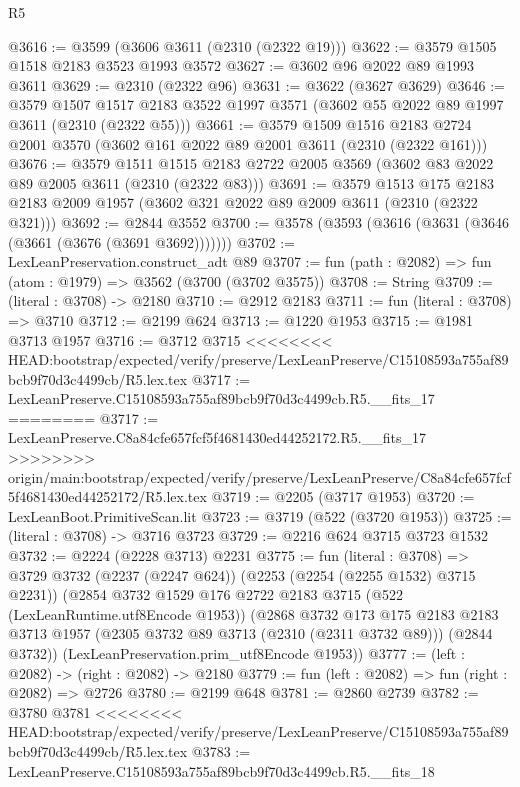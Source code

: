 \begin{lexlean}{R5}
\begin{coremodule}
{{{{{{{{{{{{{{{{{{{{{{{{{{{{{{{{{{{{{{{{{{{{{{{{{{{{{{{{{{{{{{@3616 := @3599 (@3606 @3611 (@2310 (@2322 @19)))
@3622 := @3579 @1505 @1518 @2183 @3523 @1993 @3572
@3627 := @3602 @96 @2022 @89 @1993 @3611
@3629 := @2310 (@2322 @96)
@3631 := @3622 (@3627 @3629)
@3646 := @3579
    @1507
    @1517
    @2183
    @3522
    @1997
    @3571
    (@3602 @55 @2022 @89 @1997 @3611 (@2310 (@2322 @55)))
@3661 := @3579
    @1509
    @1516
    @2183
    @2724
    @2001
    @3570
    (@3602 @161 @2022 @89 @2001 @3611 (@2310 (@2322 @161)))
@3676 := @3579
    @1511
    @1515
    @2183
    @2722
    @2005
    @3569
    (@3602 @83 @2022 @89 @2005 @3611 (@2310 (@2322 @83)))
@3691 := @3579
    @1513
    @175
    @2183
    @2183
    @2009
    @1957
    (@3602 @321 @2022 @89 @2009 @3611 (@2310 (@2322 @321)))
@3692 := @2844 @3552
@3700 := @3578 (@3593 (@3616 (@3631 (@3646 (@3661 (@3676 (@3691 @3692)))))))
@3702 := LexLeanPreservation.construct_adt @89
@3707 := fun (path : @2082) => fun (atom : @1979) => @3562 (@3700 (@3702 @3575))
@3708 := String
@3709 := (literal : @3708) -> @2180
@3710 := @2912 @2183
@3711 := fun (literal : @3708) => @3710
@3712 := @2199 @624
@3713 := @1220 @1953
@3715 := @1981 @3713 @1957
@3716 := @3712 @3715
<<<<<<<< HEAD:bootstrap/expected/verify/preserve/LexLeanPreserve/C15108593a755af89bcb9f70d3c4499cb/R5.lex.tex
@3717 := LexLeanPreserve.C15108593a755af89bcb9f70d3c4499cb.R5.__fits_17
========
@3717 := LexLeanPreserve.C8a84cfe657fcf5f4681430ed44252172.R5.__fits_17
>>>>>>>> origin/main:bootstrap/expected/verify/preserve/LexLeanPreserve/C8a84cfe657fcf5f4681430ed44252172/R5.lex.tex
@3719 := @2205 (@3717 @1953)
@3720 := LexLeanBoot.PrimitiveScan.lit
@3723 := @3719 (@522 (@3720 @1953))
@3725 := (literal : @3708) -> @3716 @3723
@3729 := @2216 @624 @3715 @3723 @1532
@3732 := @2224 (@2228 @3713) @2231
@3775 := fun (literal : @3708) =>
  @3729
    @3732
    (@2237 (@2247 @624))
    (@2253 (@2254 (@2255 @1532) @3715 @2231))
    (@2854
      @3732
      @1529
      @176
      @2722
      @2183
      @3715
      (@522 (LexLeanRuntime.utf8Encode @1953))
      (@2868
        @3732
        @173
        @175
        @2183
        @2183
        @3713
        @1957
        (@2305 @3732 @89 @3713 (@2310 (@2311 @3732 @89)))
        (@2844 @3732))
      (LexLeanPreservation.prim_utf8Encode @1953))
@3777 := (left : @2082) -> (right : @2082) -> @2180
@3779 := fun (left : @2082) => fun (right : @2082) => @2726
@3780 := @2199 @648
@3781 := @2860 @2739
@3782 := @3780 @3781
<<<<<<<< HEAD:bootstrap/expected/verify/preserve/LexLeanPreserve/C15108593a755af89bcb9f70d3c4499cb/R5.lex.tex
@3783 := LexLeanPreserve.C15108593a755af89bcb9f70d3c4499cb.R5.__fits_18
}}}}}}}}}}}}}}}}}}}}}}}}}}}}}}}}}}}}}}}}}}}}}}}}}}}}}}}}}}}}}}
\end{coremodule}
\end{lexlean}
